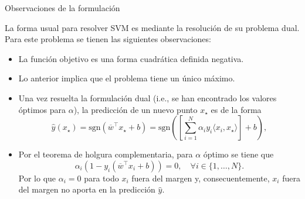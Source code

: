 \documentclass[handout, 9pt]{beamer}
\begin{document}
\begin{frame}{Observaciones de la formulación}

La forma usual para resolver SVM es mediante la resolución de su problema dual. Para este problema se tienen las siguientes observaciones:

\begin{itemize}
	\item La función objetivo es una forma cuadrática definida negativa.\pause
	\item Lo anterior implica que el problema tiene un único máximo.\pause
	\item Una vez resuelta la formulación dual (i.e., se han encontrado los valores óptimos para $\alpha$), la predicción de un nuevo punto $x_\star$ es de la forma 
\begin{equation*}
 	\hat{y}(x_\star)= \text{sgn} (\overline{w}^\top x_\star + b) = \text{sgn}\left(\left[\sum\limits_{i=1}^{N} \alpha_i y_i \langle x_i, x_\star\rangle\right] + b\right),
 \end{equation*}\pause
 
\item Por el teorema de holgura complementaria, para $\alpha$ óptimo se tiene que
\begin{equation*}
	\alpha_i \left(1-y_i (\overline{w}^\top x_i +b)\right) = 0,\quad \forall i\in\{1,\ldots,N\}.
\end{equation*}
Por lo que $\alpha_i=0$ para todo $x_i$ fuera del margen y, consecuentemente, $x_i$ fuera del margen no aporta en la predicción $\hat{y}$.

\end{itemize}
	
\end{frame}
\end{document}
